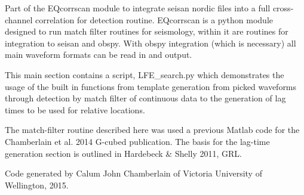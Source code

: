 \documentclass[a4paper,10pt,english]{sphinxmanual}
\begin{document}
Part of the EQcorrscan module to integrate seisan nordic files into a full
cross-channel correlation for detection routine.
EQcorrscan is a python module designed to run match filter routines for
seismology, within it are routines for integration to seisan and obspy.
With obspy integration (which is necessary) all main waveform formats can be
read in and output.

This main section contains a script, LFE\_search.py which demonstrates the usage
of the built in functions from template generation from picked waveforms
through detection by match filter of continuous data to the generation of lag
times to be used for relative locations.

The match-filter routine described here was used a previous Matlab code for the
Chamberlain et al. 2014 G-cubed publication.  The basis for the lag-time
generation section is outlined in Hardebeck \& Shelly 2011, GRL.

Code generated by Calum John Chamberlain of Victoria University of Wellington,
2015.
\end{document}
